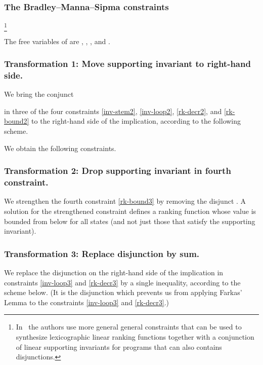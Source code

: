 \documentclass[a4paper]{llncs}
\begin{document}
\subsubsection{The Bradley--Manna--Sipma constraints}\noindent

\footnote{
In~\cite{cav/BradleyMS05} the authors use more general general constraints that can be used to synthesize lexicographic linear ranking functions together with a conjunction of linear supporting invariants for programs that can also contains disjunctions.}

The free variables of
 are , , , and .






\subsubsection{Transformation 1: Move supporting invariant to right-hand side.}
We bring the conjunct
 
in three of the four constraints \eqref{inv-stem2}, \eqref{inv-loop2}, \eqref{rk-decr2}, and \eqref{rk-bound2}
to the right-hand side of the implication, according to the following scheme.

We obtain the following constraints.




\subsubsection{Transformation 2: Drop supporting invariant in fourth constraint.}
We strengthen the fourth constraint \eqref{rk-bound3} by removing the disjunct .
A solution for the strengthened constraint defines a ranking function
whose value is bounded from below for all states (and not just those that
satisfy the supporting invariant).

\subsubsection[Step 3: Replace disjunction by sum.]{Transformation 3: Replace disjunction by sum.}
We replace the disjunction on the right-hand side of the implication in constraints \eqref{inv-loop3} and \eqref{rk-decr3} by a single inequality, according to the scheme below. (It is the disjunction which prevents us from applying Farkas' Lemma to the constraints \eqref{inv-loop3} and \eqref{rk-decr3}.)
\end{document}
